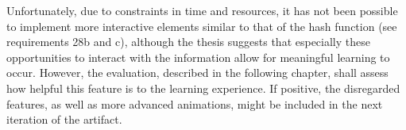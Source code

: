 Unfortunately, due to constraints in time and resources, it has not been possible to implement more interactive elements similar to that of the hash function (see requirements 28b and c), although the thesis suggests that especially these opportunities to interact with the information allow for meaningful learning to occur. However, the evaluation, described in the following chapter, shall assess how helpful this feature is to the learning experience. If positive, the disregarded features, as well as more advanced animations, might be included in the next iteration of the artifact. 